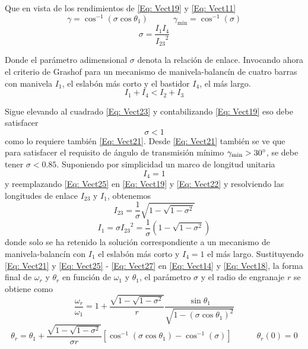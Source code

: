 \documentclass[12pt, final]{extarticle}
\begin{document}
Que en vista de los rendimientos de \eqref{Eq: Vect19} y \eqref{Eq: Vect11}
\begin{equation}
    \gamma=\cos^{-1}{(\sigma\cos{\theta_1})}   \quad\quad\quad \gamma_{\text{min}}=\cos^{-1}{(\sigma)}
   \label{Eq: Vect21}
\end{equation}
\begin{equation}
    \sigma=\frac{I_1 I_4}{{I_{23}}^2}
   \label{Eq: Vect22}
\end{equation}

Donde el parámetro adimensional $\sigma$ denota la relación de enlace. Invocando
ahora el criterio de Grashof para un mecanismo de manivela-balancín de cuatro
barras con manivela $I_1$, el eslabón más corto y el bastidor $I_4$, el más
largo.
\begin{equation}
    I_1+I_4 < I_2+I_3
   \label{Eq: Vect23}
\end{equation}

Sigue elevando al cuadrado \eqref{Eq: Vect23} y contabilizando \eqref{Eq:
Vect19} eso debe satisfacer
\begin{equation}
    \sigma < 1
   \label{Eq: Vect24}
\end{equation}
como lo requiere también \eqref{Eq: Vect21}. Desde \eqref{Eq: Vect21} también se
ve que para satisfacer el requisito de ángulo de transmisión mínimo
$\gamma_{\text{min}}>30\degree$, se debe tener $\sigma<0.85$. Suponiendo por
simplicidad un marco de longitud unitaria
\begin{equation}
    I_4=1
   \label{Eq: Vect25}
\end{equation}
y reemplazando \eqref{Eq: Vect25} en \eqref{Eq: Vect19} y \eqref{Eq: Vect22} y
resolviendo las longitudes de enlace $I_{23}$ y $I_1$, obtenemos
\begin{equation}
    I_{23}=\frac{1}{\sigma}\sqrt{1-\sqrt{1-{\sigma}^2}}
   \label{Eq: Vect26}
\end{equation}
\begin{equation}
    I_1=\sigma{I_{23}}^2=\frac{1}{\sigma}(1-\sqrt{1-{\sigma}^2})
   \label{Eq: Vect27}
\end{equation}
donde solo se ha retenido la solución correspondiente a un mecanismo de
manivela-balancín con $I_1$ el eslabón más corto y $I_4=1$ el más largo.
Sustituyendo \eqref{Eq: Vect21} y \eqref{Eq: Vect25} - \eqref{Eq: Vect27} en
\eqref{Eq: Vect14} y \eqref{Eq: Vect18}, la forma final de $\omega_r$ y
$\theta_r$ en función de $\omega_1$ y $\theta_1$, el parámetro $\sigma$ y el
radio de engranaje $r$ se obtiene como
\begin{equation}
   \frac{\omega_r}{\omega_1}=1+\frac{\sqrt{1-\sqrt{1-{\sigma}^2}}}{r}\frac{\sin{\theta_1}}{\sqrt{1-{(\sigma\cos{\theta_1})}^2}}
   \label{Eq: Vect28}
\end{equation}
\begin{equation}
   \theta_r=\theta_1+\frac{\sqrt{1-\sqrt{1-{\sigma}^2}}}{\sigma r}[\cos^{-1}{(\sigma\cos{\theta_1})}-\cos^{-1}{(\sigma)}] \quad\quad\quad \theta_r(0)=0
   \label{Eq: Vect29}
\end{equation}
\end{document}
